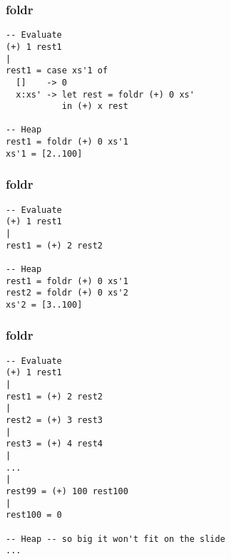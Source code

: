 \documentclass{beamer}
\begin{document}
\begin{frame}[t,fragile]
\frametitle{foldr}
\begin{verbatim}
-- Evaluate
(+) 1 rest1
|
rest1 = case xs'1 of
  []    -> 0
  x:xs' -> let rest = foldr (+) 0 xs'
           in (+) x rest

-- Heap
rest1 = foldr (+) 0 xs'1
xs'1 = [2..100]
\end{verbatim}
\end{frame}

\begin{frame}[t,fragile]
\frametitle{foldr}
\begin{verbatim}
-- Evaluate
(+) 1 rest1
|
rest1 = (+) 2 rest2

-- Heap
rest1 = foldr (+) 0 xs'1
rest2 = foldr (+) 0 xs'2
xs'2 = [3..100]
\end{verbatim}
\end{frame}

\begin{frame}[t,fragile]
\frametitle{foldr}
\begin{verbatim}
-- Evaluate
(+) 1 rest1
|
rest1 = (+) 2 rest2
|
rest2 = (+) 3 rest3
|
rest3 = (+) 4 rest4
|
...
|
rest99 = (+) 100 rest100
|
rest100 = 0

-- Heap -- so big it won't fit on the slide
...
\end{verbatim}
\end{frame}
\end{document}

